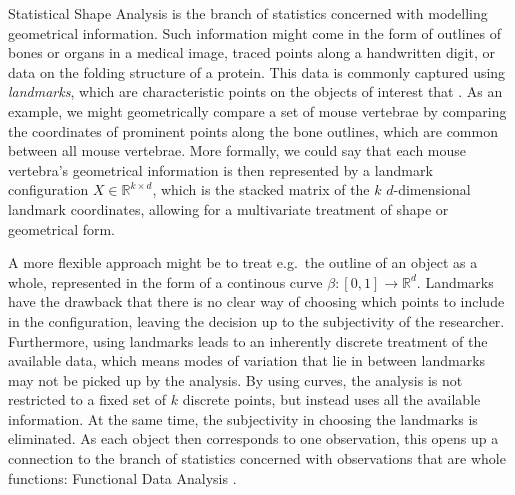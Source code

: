 \label{sec:1}
Statistical Shape Analysis \parencite[see e.g.][]{DrydenMardia2016} is the branch of statistics concerned with modelling geometrical information.
Such information might come in the form of outlines of bones or organs in a medical image, traced points along a handwritten digit, or data on the folding structure of a protein.
This data is commonly captured using \emph{landmarks}, which are characteristic points on the objects of interest that .
As an example, we might geometrically compare a set of mouse vertebrae by comparing the coordinates of prominent points along the bone outlines, which are common between all mouse vertebrae.
More formally, we could say that each mouse vertebra's geometrical information is then represented by a landmark configuration $X \in \mathbb{R}^{k \times d}$, which is the stacked matrix of the $k$ $d$-dimensional landmark coordinates, allowing for a multivariate treatment of shape or geometrical form.

A more flexible approach might be to treat e.g.\ the outline of an object as a whole, represented in the form of a continous curve $\beta : [0,1] \rightarrow \mathbb{R}^d$. 
Landmarks have the drawback that there is no clear way of choosing which points to include in the configuration, leaving the decision up to the subjectivity of the researcher. 
Furthermore, using landmarks leads to an inherently discrete treatment of the available data, which means modes of variation that lie in between landmarks may not be picked up by the analysis.  
By using curves, the analysis is not restricted to a fixed set of $k$ discrete points, but instead uses all the available information.
At the same time, the subjectivity in choosing the landmarks is eliminated.
As each object then corresponds to one observation, this opens up a connection to the branch of statistics concerned with observations that are whole functions: Functional Data Analysis \parencite[see e.g.][]{RamsaySilverman2005}.


